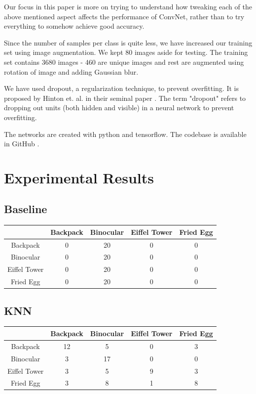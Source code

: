 \documentclass{article} %
\begin{document}
Our focus in this paper is more on trying to understand how tweaking each of the above mentioned aspect affects the performance of ConvNet, rather than to try everything to somehow achieve good accuracy.
\par Since the number of samples per class is quite less, we have increased our training set using image augmentation. We kept 80 images aside for testing. The training set contains 3680 images - 460 are unique images and rest are augmented using rotation of image and adding Gaussian blur.  

We have used dropout, a regularization technique, to prevent overfitting. It is proposed by Hinton et. al. in their seminal paper \cite{dropout_paper}. The term "dropout" refers to dropping out units (both hidden and visible) in a neural network to prevent overfitting.

The networks are created with python and tensorflow. The codebase is available in GitHub \cite{cnn_github}.

\section{Experimental Results}

\subsection{Baseline}

\centering
\begin{tabular}{|c|c|c|c|c|}
\hline 
&
Backpack &
Binocular &
Eiffel Tower &
Fried Egg \\
\hline 
Backpack &
0 &
20 &
0 &
0 \\
\hline 
Binocular &
0 &
20 &
0 &
0 \\
\hline 
Eiffel Tower &
0 &
20 &
0 &
0 \\
\hline
Fried Egg &
0 &
20 &
0 &
0 \\
\hline
\end{tabular}


\subsection{KNN}

\centering
\begin{tabular}{|c|c|c|c|c|}
\hline 
&
Backpack &
Binocular &
Eiffel Tower &
Fried Egg \\
\hline 
Backpack &
12 &
5 &
0 &
3 \\
\hline 
Binocular &
3 &
17 &
0 &
0 \\
\hline 
Eiffel Tower &
3 &
5 &
9 &
3 \\
\hline
Fried Egg &
3 &
8 &
1 &
8 \\
\hline
\end{tabular}
\end{document}
